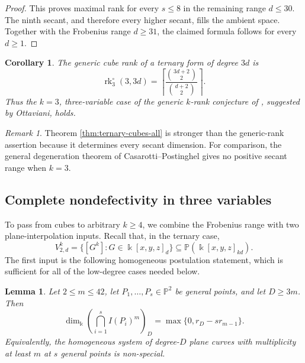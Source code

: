 \documentclass[11pt]{amsart}
\newtheorem{corollary}[theorem]{Corollary}
\newtheorem{lemma}[theorem]{Lemma}
\theoremstyle{remark}
\newtheorem{remark}[theorem]{Remark}
\newcommand{\PP}{\mathbb P}
\newcommand{\kk}{\Bbbk}
\begin{document}
\begin{proof}
This proves maximal rank for every $s\le8$ in the remaining range $d\le30$. The ninth secant, and therefore every higher secant, fills the ambient space. Together with the Frobenius range $d\ge31$, the claimed formula follows for every $d\ge1$.
\end{proof}

\begin{corollary}\label{cor:generic-ternary-cube-rank}
The generic cube rank of a ternary form of degree $3d$ is
$$
\operatorname{rk}^{\circ}_3(3,3d)
=
\left\lceil
\frac{\binom{3d+2}{2}}{\binom{d+2}{2}}
\right\rceil.
$$
Thus the $k=3$, three-variable case of the generic $k$-rank conjecture of \cite[Conjecture~1.2]{LORS}, suggested by Ottaviani, holds.
\end{corollary}

\begin{remark}
Theorem \ref{thm:ternary-cubes-all} is stronger than the generic-rank assertion because it determines every secant dimension. For comparison, the general degeneration theorem of Casarotti--Postinghel \cite{CasarottiPostinghel} gives no positive secant range when $k=3$.
\end{remark}

\subsection{Complete nondefectivity in three variables}\label{subsec:all-k-rank}

To pass from cubes to arbitrary $k\ge4$, we combine the Frobenius range with two plane-interpolation inputs. Recall that, in the ternary case,
$$
V^k_{2,d}
=
\{[G^k]:G\in\kk[x,y,z]_d\}
\subseteq
\PP(\kk[x,y,z]_{kd}).
$$
The first input is the following homogeneous postulation statement, which is sufficient for all of the low-degree cases needed below.

\begin{lemma}\label{lem:homogeneous-postulation}
Let $2\le m\le42$, let $P_1,\ldots,P_s\in\PP^2$ be general points, and let $D\ge3m$. Then
$$
\dim_{\kk}\left(\bigcap_{i=1}^s I(P_i)^m\right)_D
=
\max\{0,r_D-sr_{m-1}\}.
$$
Equivalently, the homogeneous system of degree-$D$ plane curves with multiplicity at least $m$ at $s$ general points is non-special.
\end{lemma}
\end{document}
